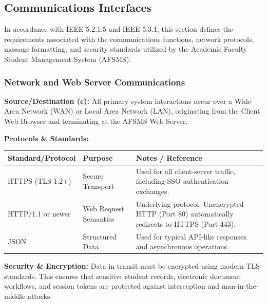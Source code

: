 \documentclass[11pt, a4paper]{article}
\begin{document}
\subsection{Communications Interfaces}
In accordance with IEEE 5.2.1.5 and IEEE 5.3.1, this section defines the requirements associated with the communications functions, network protocols, message formatting, and security standards utilized by the Academic Faculty Student Management System (AFSMS).

\subsubsection{Network and Web Server Communications}
\textbf{Source/Destination (c):}
All primary system interactions occur over a Wide Area Network (WAN) or Local Area Network (LAN), originating from the Client Web Browser and terminating at the AFSMS Web Server.

\textbf{Protocols \& Standards:}
\begin{table}[H]
\begin{tabularx}{\textwidth}{>{\raggedright\arraybackslash}p{2.2cm} >{\raggedright\arraybackslash}p{2cm} >{\raggedright\arraybackslash}X}
\toprule
\textbf{Standard/Protocol} & \textbf{Purpose} & \textbf{Notes / Reference} \\
\midrule
HTTPS (TLS 1.2+) & Secure Transport & Used for all client-server traffic, including SSO authentication exchanges. \\
\midrule
HTTP/1.1 or newer & Web Request Semantics & Underlying protocol. Unencrypted HTTP (Port 80) automatically redirects to HTTPS (Port 443). \\
\midrule
JSON & Structured Data & Used for typical API-like responses and asynchronous operations. \\
\bottomrule
\end{tabularx}
\end{table}

\textbf{Security \& Encryption:}
Data in transit must be encrypted using modern TLS standards. This ensures that sensitive student records, electronic document workflows, and session tokens are protected against interception and man-in-the-middle attacks.
\end{document}
